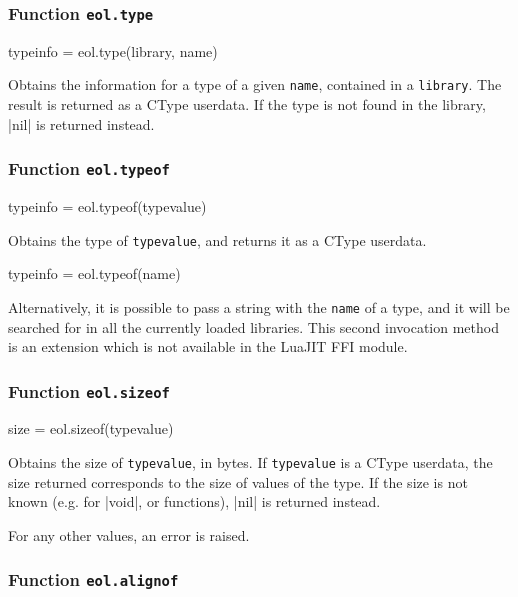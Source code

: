 \subsubsection{Function \texttt{eol.type}}
	\label{sec:eol-api-type}

\begin{luacode}
typeinfo = eol.type(library, name)
\end{luacode}

Obtains the information for a type of a given \texttt{name},
contained in a \texttt{library}. The result is returned as a \textsf{CType}
userdata. If the type is not found in the library, \Mlua|nil| is returned
instead.


\subsubsection{Function \texttt{eol.typeof}}
	\label{sec:eol-api-typeof}

\begin{luacode}
	typeinfo = eol.typeof(typevalue)
\end{luacode}

Obtains the type of \texttt{typevalue}, and returns it as a \textsf{CType}
userdata.

\begin{luacode}
	typeinfo = eol.typeof(name)
\end{luacode}

Alternatively, it is possible to pass a string with the \texttt{name} of
a type, and it will be searched for in all the currently loaded libraries.
This second invocation method is an \Eol* extension which is not available in
the LuaJIT FFI module.

\subsubsection{Function \texttt{eol.sizeof}}

\begin{luacode}
  size = eol.sizeof(typevalue)
\end{luacode}

Obtains the size of \texttt{typevalue}, in bytes. If \texttt{typevalue} is
a \textsf{CType} userdata, the size returned corresponds to the size of values
of the type. If the size is not known (e.g. for \Mc|void|, or functions),
\Mlua|nil| is returned instead.

For any other values, an error is raised.

\subsubsection{Function \texttt{eol.alignof}}
	\label{sec:eol-api-alignof}

